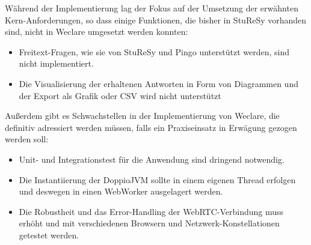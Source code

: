 Während der Implementierung lag der Fokus auf der Umsetzung der erwähnten Kern-Anforderungen, so dass einige Funktionen, die bisher in StuReSy vorhanden sind, nicht in Weclare umgesetzt werden konnten:
\begin{itemize}
    \item Freitext-Fragen, wie sie von StuReSy und Pingo unterstützt werden, sind nicht implementiert.
    \item Die Visualisierung der erhaltenen Antworten in Form von Diagrammen und der Export als Grafik oder CSV wird nicht unterstützt
\end{itemize}

Außerdem gibt es Schwachstellen in der Implementierung von Weclare, die definitiv adressiert werden müssen, falls ein Praxiseinsatz in Erwägung gezogen werden soll:
\begin{itemize}
    \item Unit- und Integrationstest für die Anwendung sind dringend notwendig.
    \item Die Instantiierung der DoppioJVM sollte in einem eigenen Thread erfolgen und deswegen in einen WebWorker ausgelagert werden.
    \item Die Robustheit und das Error-Handling der WebRTC-Verbindung muss erhöht und mit verschiedenen Browsern und Netzwerk-Konstellationen getestet werden.
\end{itemize}




